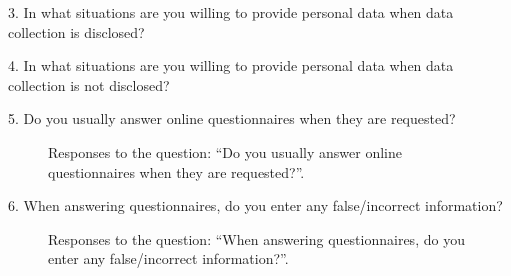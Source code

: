 3. In what situations are you willing to provide personal data when data collection is disclosed?

4. In what situations are you willing to provide personal data when data collection is not disclosed?

5. Do you usually answer online questionnaires when they are requested?

\begin{figure}[H]
    \begin{center}
        \caption{Responses to the question: ``Do you usually answer online questionnaires when they are requested?''.}
        \label{fig:survey_s5_q5}
    \end{center}
\end{figure}

6. When answering questionnaires, do you enter any false/incorrect information?

\begin{figure}[H]
    \begin{center}
        \caption{Responses to the question: ``When answering questionnaires, do you enter any false/incorrect information?''.}
        \label{fig:survey_s5_q6}
    \end{center}
\end{figure}


